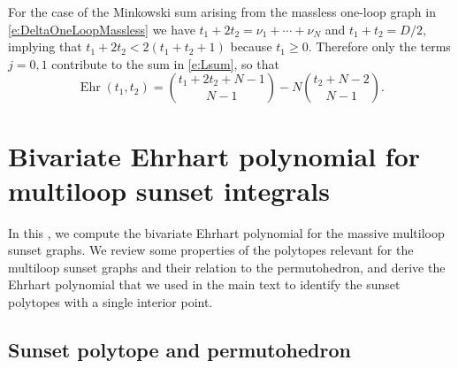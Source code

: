 \documentclass[12pt,a4paper]{article}
\theoremstyle{plain}
\theoremstyle{remark}
\newcommand{\nprops}{N}
\DeclareMathOperator{\ehr}{Ehr}
\begin{document}
For the case of the Minkowski sum arising from the massless one-loop
graph in \cref{e:DeltaOneLoopMassless} we have
$t_1+2t_2=\nu_1+\cdots+\nu_\nprops$ and $t_1+t_2=D/2$, implying that \(t_1+2t_2 < 2(t_1+t_2+1)\) because $t_1\geq0$.
Therefore only the terms \(j=0,1\) contribute to the sum in
\cref{e:Lsum}, so that
\begin{equation}
\ehr(t_1,t_2)
= \binom{t_1+2t_2+\nprops-1}{\nprops-1}
  - N \binom{t_2+\nprops-2}{\nprops-1}.
\end{equation}

\section{Bivariate Ehrhart polynomial for multiloop sunset integrals}
\label{app:sunsetEhrhart}

In this , we compute the bivariate Ehrhart polynomial for the
massive multiloop sunset graphs. We review some properties of the
polytopes relevant for the multiloop sunset graphs and their relation to the
permutohedron, and derive the Ehrhart polynomial that we used in the
main text to identify the sunset polytopes with a single interior
point.

\subsection{Sunset polytope and permutohedron}\label{app:sunsetpolytope}
\end{document}
